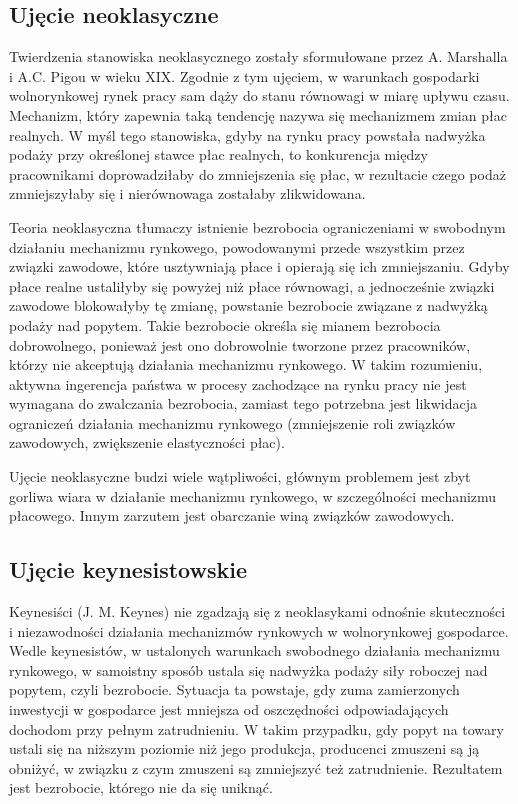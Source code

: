 \documentclass[12pt]{extarticle}
\begin{document}
\subsection{Ujęcie neoklasyczne}

Twierdzenia stanowiska neoklasycznego zostały sformułowane przez A. Marshalla i A.C. Pigou w wieku XIX. Zgodnie z tym ujęciem, w warunkach gospodarki wolnorynkowej rynek pracy sam dąży do stanu równowagi w miarę upływu czasu. Mechanizm, który zapewnia taką tendencję nazywa się mechanizmem zmian płac realnych. W myśl tego stanowiska, gdyby na rynku pracy powstała nadwyżka podaży przy określonej stawce płac realnych, to konkurencja między pracownikami doprowadziłaby do zmniejszenia się płac, w rezultacie czego podaż zmniejszyłaby się i nierównowaga zostałaby zlikwidowana.

Teoria neoklasyczna tłumaczy istnienie bezrobocia ograniczeniami w swobodnym działaniu mechanizmu rynkowego, powodowanymi przede wszystkim przez związki zawodowe, które usztywniają płace i opierają się ich zmniejszaniu. Gdyby płace realne ustaliłyby się powyżej niż płace równowagi, a jednocześnie związki zawodowe blokowałyby tę zmianę, powstanie bezrobocie związane z nadwyżką podaży nad popytem. Takie bezrobocie określa się mianem bezrobocia dobrowolnego, ponieważ jest ono dobrowolnie tworzone przez pracowników, którzy nie akceptują działania mechanizmu rynkowego. W takim rozumieniu, aktywna ingerencja państwa w procesy zachodzące na rynku pracy nie jest wymagana do zwalczania bezrobocia, zamiast tego potrzebna jest likwidacja ograniczeń działania mechanizmu rynkowego (zmniejszenie roli związków zawodowych, zwiększenie elastyczności płac).

Ujęcie neoklasyczne budzi wiele wątpliwości, głównym problemem jest zbyt gorliwa wiara w działanie mechanizmu rynkowego, w szczególności mechanizmu płacowego. Innym zarzutem jest obarczanie winą związków zawodowych.


\subsection{Ujęcie keynesistowskie}

Keynesiści (J. M. Keynes) nie zgadzają się z neoklasykami odnośnie skuteczności i niezawodności działania mechanizmów rynkowych w wolnorynkowej gospodarce. Wedle keynesistów, w ustalonych warunkach swobodnego działania mechanizmu rynkowego, w samoistny sposób ustala się nadwyżka podaży siły roboczej nad popytem, czyli bezrobocie. Sytuacja ta powstaje, gdy zuma zamierzonych inwestycji w gospodarce jest mniejsza od oszczędności odpowiadających dochodom przy pełnym zatrudnieniu. W takim przypadku, gdy popyt na towary ustali się na niższym poziomie niż jego produkcja, producenci zmuszeni są ją obniżyć, w związku z czym zmuszeni są zmniejszyć też zatrudnienie. Rezultatem jest bezrobocie, którego nie da się uniknąć.
\end{document}
